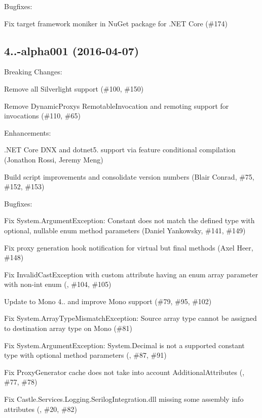 Bugfixes\+:
\begin{DoxyItemize}
\item Fix target framework moniker in Nu\+Get package for .N\+ET Core (\#174)
\end{DoxyItemize}

\subsection*{4..-\/alpha001 (2016-\/04-\/07)}

Breaking Changes\+:
\begin{DoxyItemize}
\item Remove all Silverlight support (\#100, \#150)
\item Remove Dynamic\+Proxy\textquotesingle{}s Remotable\+Invocation and remoting support for invocations (\#110, \#65)
\end{DoxyItemize}

Enhancements\+:
\begin{DoxyItemize}
\item .N\+ET Core D\+NX and dotnet5. support via feature conditional compilation (Jonathon Rossi, Jeremy Meng)
\item Build script improvements and consolidate version numbers (Blair Conrad, \#75, \#152, \#153)
\end{DoxyItemize}

Bugfixes\+:
\begin{DoxyItemize}
\item Fix \textquotesingle{}System.\+Argument\+Exception\+: Constant does not match the defined type\textquotesingle{} with optional, nullable enum method parameters (Daniel Yankowsky, \#141, \#149)
\item Fix proxy generation hook notification for virtual but final methods (Axel Heer, \#148)
\item Fix Invalid\+Cast\+Exception with custom attribute having an enum array parameter with non-\/int enum (, \#104, \#105)
\item Update to Mono 4.. and improve Mono support (\#79, \#95, \#102)
\item Fix \textquotesingle{}System.\+Array\+Type\+Mismatch\+Exception\+: Source array type cannot be assigned to destination array type\textquotesingle{} on Mono (\#81)
\item Fix \textquotesingle{}System.\+Argument\+Exception\+: System.\+Decimal is not a supported constant type\textquotesingle{} with optional method parameters (, \#87, \#91)
\item Fix Proxy\+Generator cache does not take into account Additional\+Attributes (, \#77, \#78)
\item Fix Castle.\+Services.\+Logging.\+Serilog\+Integration.\+dll missing some assembly info attributes (, \#20, \#82)
\end{DoxyItemize}

